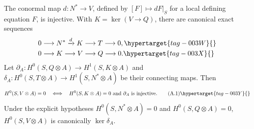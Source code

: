 \begin{proposition}\hypertarget{tag-01AD}{}\label{cdp:st:A.1.1}

\label{wbII:prop:criterion}\label{wbII:prop:filtration}\label{wbII:lem:conormal}\label{wbII:lem:conormal-injective}\label{wbII:prop:missing-global-section-criterion}\label{wbII:prop:missing-cotangent-filtration}
The conormal map $d:N^*\to V$, defined by $[F]\mapsto dF|_S$ for a local defining equation $F$, is injective. With $K=\ker(V\to Q)$, there are canonical exact sequences
\begin{align}
0&\longrightarrow N^*\xrightarrow{d}K\longrightarrow T\longrightarrow0,
\hypertarget{tag-003W}{}\label{cdp:A:filtration1}\\
0&\longrightarrow K\longrightarrow V\longrightarrow Q\longrightarrow0.
\hypertarget{tag-003X}{}\label{cdp:A:filtration2}
\end{align}
Let $\partial_A:H^0(S,Q\otimes A)\to H^1(S,K\otimes A)$ and $\delta_A:H^0(S,T\otimes A)\to H^1(S,N^*\otimes A)$ be their connecting maps. Then
\[
 H^0(S,V\otimes A)=0
 \quad\Longleftrightarrow\quad
 H^0(S,K\otimes A)=0\ \hbox{and}\ \partial_A\hbox{ is injective}.
\tag{A.1}\hypertarget{tag-003Y}{}\label{cdp:eq:A.1}
\]
Under the explicit hypotheses $H^0(S,N^*\otimes A)=0$ and $H^0(S,Q\otimes A)=0$, $H^0(S,V\otimes A)$ is canonically $\ker\delta_A$.
\end{proposition}

